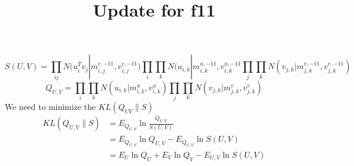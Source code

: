 \documentclass[letterpaper]{article}
\begin{document}
%
 \graphicspath{{figure/}}

\title{Update for f11}
\author{}
\maketitle
\begin{equation}
    S(U,V) = \prod_{ij}N(u_i^Tv_j|m_{i,j}^{c,-11}, v_{i,j}^{c,-11}) \prod_i \prod_k N(u_{i,k}|m_{i,k}^{u,-11}, v_{i,k}^{u,-11} \prod_j \prod_k N(v_{j,k}|m_{j,k}^{v,-11}, v_{j,k}^{v,-11})
\end{equation}
\begin{equation}
    Q_{U,V} = \prod_i \prod_k N(u_{i,k}|m_{i,k}^u, v_{i,k}^u) \prod_j \prod_k N(v_{j,k}|m_{j,k}^v, v_{j,k}^v)
\end{equation}
We need to minimize the $KL(Q_{UV}\|S)$
\begin{equation}
    \begin{split}
    KL(Q_{U,V}\|S) 
    &= E_{Q_{U,V}} \ln \frac{Q_{U,V}}{S(U,V)}\\
    &= E_{Q_{U,V}} \ln Q_{U,V} - E_{Q_{U,V}} \ln S(U,V)\\
    &= E_U \ln Q_U + E_V \ln Q_V - E_{U,V} \ln S(U,V)
    \end{split}
\end{equation}
\end{document}
